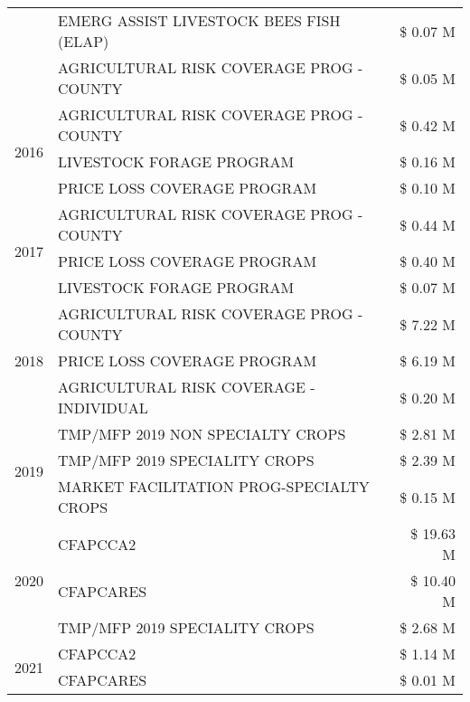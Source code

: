 \begin{tabular}{llr}
 & EMERG ASSIST LIVESTOCK BEES FISH (ELAP) & \$ 0.07 M \\
 & AGRICULTURAL RISK COVERAGE PROG - COUNTY & \$ 0.05 M \\
\cline{1-3}
\multirow[t]{3}{*}{2016} & AGRICULTURAL RISK COVERAGE PROG - COUNTY      & \$ 0.42 M \\
 & LIVESTOCK FORAGE PROGRAM                      & \$ 0.16 M \\
 & PRICE LOSS COVERAGE PROGRAM                   & \$ 0.10 M \\
\cline{1-3}
\multirow[t]{3}{*}{2017} & AGRICULTURAL RISK COVERAGE PROG - COUNTY & \$ 0.44 M \\
 & PRICE LOSS COVERAGE PROGRAM & \$ 0.40 M \\
 & LIVESTOCK FORAGE PROGRAM & \$ 0.07 M \\
\cline{1-3}
\multirow[t]{3}{*}{2018} & AGRICULTURAL RISK COVERAGE PROG - COUNTY & \$ 7.22 M \\
 & PRICE LOSS COVERAGE PROGRAM & \$ 6.19 M \\
 & AGRICULTURAL RISK COVERAGE - INDIVIDUAL & \$ 0.20 M \\
\cline{1-3}
\multirow[t]{3}{*}{2019} & TMP/MFP 2019 NON SPECIALTY CROPS & \$ 2.81 M \\
 & TMP/MFP 2019 SPECIALITY CROPS & \$ 2.39 M \\
 & MARKET FACILITATION PROG-SPECIALTY CROPS & \$ 0.15 M \\
\cline{1-3}
\multirow[t]{3}{*}{2020} & CFAPCCA2 & \$ 19.63 M \\
 & CFAPCARES & \$ 10.40 M \\
 & TMP/MFP 2019 SPECIALITY CROPS & \$ 2.68 M \\
\cline{1-3}
\multirow[t]{2}{*}{2021} & CFAPCCA2 & \$ 1.14 M \\
 & CFAPCARES & \$ 0.01 M \\
\cline{1-3}
\bottomrule
\end{tabular}
